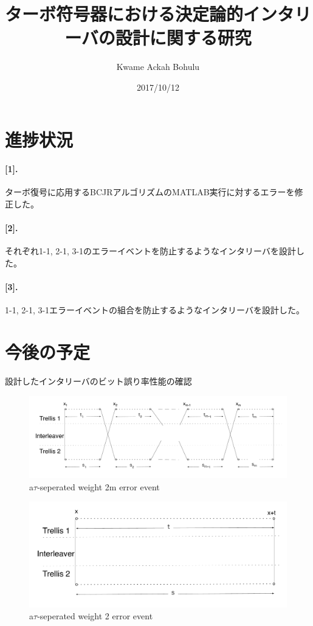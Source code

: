 \documentclass[20 pts]{article}
\title{ターボ符号器における決定論的インタリーバの設計に関する研究}
\author{Kwame Ackah Bohulu}
\date{2017/10/12}
\begin{document}
\maketitle

\newpage
\section{進捗状況}

\paragraph{[1].}
ターボ復号に応用するBCJRアルゴリズムのMATLAB実行に対するエラーを修正した。

\paragraph{[2].}

それぞれ1-1, 2-1, 3-1のエラーイベントを防止するようなインタリーバを設計した。
\paragraph{[3].}

1-1, 2-1, 3-1エラーイベントの組合を防止するようなインタリーバを設計した。
\section{今後の予定}
設計したインタリーバのビット誤り率性能の確認

\newpage
\begin{center}
\begin{figure}
		\includegraphics[width=\textwidth]{weight2m.pdf}
		\caption{a$\tau$-seperated weight 2m error event}
		\end{figure}
	\end{center}
	
	\begin{center}
\begin{figure}
		\includegraphics[width=\textwidth]{weight2.pdf}
		\caption{a$\tau$-seperated weight 2 error event}
		\end{figure}
	\end{center}
	
\end{document}
